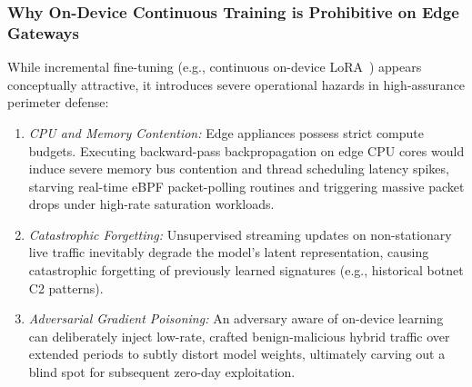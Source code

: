 \documentclass[journal]{IEEEtran}
\renewcommand{\_}{\textunderscore\allowbreak}
\begin{document}
\subsubsection{Why On-Device Continuous Training is Prohibitive on Edge Gateways}
While incremental fine-tuning (e.g., continuous on-device LoRA~\cite{dettmers2023qlora}) appears conceptually attractive, it introduces severe operational hazards in high-assurance perimeter defense:
\begin{enumerate}
  \item \textit{CPU and Memory Contention:} Edge appliances possess strict compute budgets. Executing backward-pass backpropagation on edge CPU cores would induce severe memory bus contention and thread scheduling latency spikes, starving real-time eBPF packet-polling routines and triggering massive packet drops under high-rate saturation workloads.
  \item \textit{Catastrophic Forgetting:} Unsupervised streaming updates on non-stationary live traffic inevitably degrade the model's latent representation, causing catastrophic forgetting of previously learned signatures (e.g., historical botnet C2 patterns).
  \item \textit{Adversarial Gradient Poisoning:} An adversary aware of on-device learning can deliberately inject low-rate, crafted benign-malicious hybrid traffic over extended periods to subtly distort model weights, ultimately carving out a blind spot for subsequent zero-day exploitation.
\end{enumerate}
\end{document}
